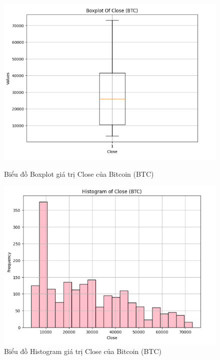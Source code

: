 \documentclass[conference]{IEEEtran}
\begin{document}
	\begin{figure}[H]
		\centering
		\begin{minipage}{0.23\textwidth}
			\centering
			\includegraphics[width=1\textwidth]{Figure/BTCBoxplot.png}
			\caption{Biểu đồ Boxplot giá trị Close của Bitcoin (BTC)}
			\label{fig:1}
		\end{minipage}
		\hfill
		\begin{minipage}{0.23\textwidth}
			\centering
			\includegraphics[width=1\textwidth]{Figure/BTCHistogram.png}
			\caption{Biểu đồ Histogram giá trị Close của Bitcoin (BTC)}
			\label{fig:2}
		\end{minipage}
	\end{figure}
	
\end{document}
